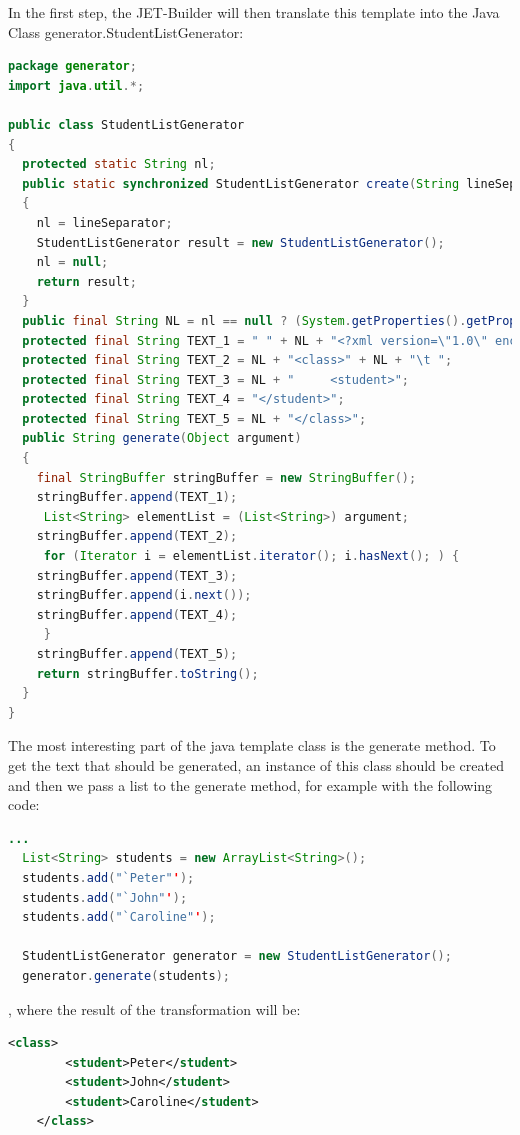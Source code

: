 In the first step, the JET-Builder will then translate this template into the Java Class generator.StudentListGenerator:
\begin{lstlisting}[caption = the translated Java-Class, language = Java]
package generator;
import java.util.*;

public class StudentListGenerator
{
  protected static String nl;
  public static synchronized StudentListGenerator create(String lineSeparator)
  {
    nl = lineSeparator;
    StudentListGenerator result = new StudentListGenerator();
    nl = null;
    return result;
  }
  public final String NL = nl == null ? (System.getProperties().getProperty("line.separator")) : nl;
  protected final String TEXT_1 = " " + NL + "<?xml version=\"1.0\" encoding=\"UTF-8\"?>";
  protected final String TEXT_2 = NL + "<class>" + NL + "\t ";
  protected final String TEXT_3 = NL + "     <student>";
  protected final String TEXT_4 = "</student>";
  protected final String TEXT_5 = NL + "</class>";
  public String generate(Object argument)
  {
    final StringBuffer stringBuffer = new StringBuffer();
    stringBuffer.append(TEXT_1);
     List<String> elementList = (List<String>) argument; 
    stringBuffer.append(TEXT_2);
     for (Iterator i = elementList.iterator(); i.hasNext(); ) { 
    stringBuffer.append(TEXT_3);
    stringBuffer.append(i.next());
    stringBuffer.append(TEXT_4);
     } 
    stringBuffer.append(TEXT_5);
    return stringBuffer.toString();
  }
}

\end{lstlisting}
The most interesting part of the java template class is the generate method. To get the text that should be generated, an instance of this class should be created and then we pass a list to the generate method, for example with the following code:
\begin{lstlisting}[caption = calling the generate method, language = Java]
  ...
  List<String> students = new ArrayList<String>();
  students.add("`Peter"');
  students.add("`John"');
  students.add("`Caroline"');
  
  StudentListGenerator generator = new StudentListGenerator();
  generator.generate(students);
\end{lstlisting}

, where the result of the transformation will be:
\begin{lstlisting}[caption = Result String of the transformation, language = xml]
	<class>
		<student>Peter</student>
		<student>John</student>
		<student>Caroline</student>
	</class>
\end{lstlisting}

